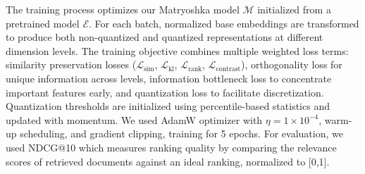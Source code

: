 The training process optimizes our Matryoshka model $\mathcal{M}$ initialized from a pretrained model $\mathcal{E}$. 
For each batch, normalized base embeddings are transformed to produce both non-quantized and quantized representations at different dimension levels. 
The training objective combines multiple weighted loss terms: similarity preservation losses ($\mathcal{L}_{\text{sim}}$, $\mathcal{L}_{\text{kl}}$, $\mathcal{L}_{\text{rank}}$, $\mathcal{L}_{\text{contrast}}$), orthogonality loss for unique information across levels, information bottleneck loss to concentrate important features early, and quantization loss to facilitate discretization. 
Quantization thresholds are initialized using percentile-based statistics and updated with momentum. We used AdamW optimizer with $\eta = 1 \times 10^{-4}$, warm-up scheduling, and gradient clipping, training for 5 epochs. 
For evaluation, we used NDCG@10 which measures ranking quality by comparing the relevance scores of retrieved documents against an ideal ranking, normalized to [0,1].
